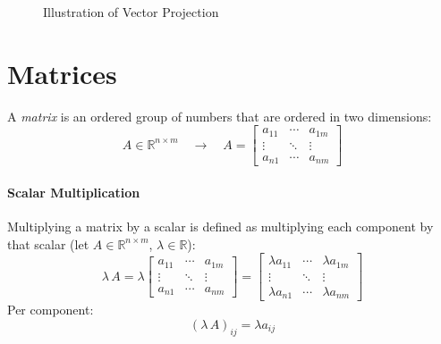 \documentclass[a4paper, 11pt, accentcolor = tud3b]{tudreport}
\newcommand{\R}{\ensuremath{\mathbb{R}}}
\renewcommand{\vec}[1]{\mathbf{#1}}
\begin{document}
				\begin{figure}
					\centering
					\caption{Illustration of Vector Projection}
					\label{fig:vectorprojection}
				\end{figure}

		\section{Matrices}
			A \emph{matrix} is an ordered group of numbers that are ordered in two dimensions:
			\begin{equation}
				A \in \R^{n \times m} \quad\rightarrow\quad A =
					\begin{bmatrix}
						a_{11} & \cdots & a_{1m} \\
						\vdots & \ddots & \vdots \\
						a_{n1} & \cdots & a_{nm}
					\end{bmatrix}
			\end{equation}

			\paragraph{Scalar Multiplication}
				Multiplying a matrix by a scalar is defined as multiplying each component by that scalar (let \( A \in \R^{n \times m} \), \( \lambda \in \R \)):
				\begin{equation}
					\lambda \, A = \lambda
						\begin{bmatrix}
							a_{11} & \cdots & a_{1m} \\
							\vdots & \ddots & \vdots \\
							a_{n1} & \cdots & a_{nm}
						\end{bmatrix}
					=
						\begin{bmatrix}
							\lambda a_{11} & \cdots & \lambda a_{1m} \\
							\vdots		 & \ddots & \vdots		 \\
							\lambda a_{n1} & \cdots & \lambda a_{nm}
						\end{bmatrix}
				\end{equation}
				Per component:
				\begin{equation}
					(\lambda \, A)_{ij} = \lambda a_{ij}
				\end{equation}
\end{document}
